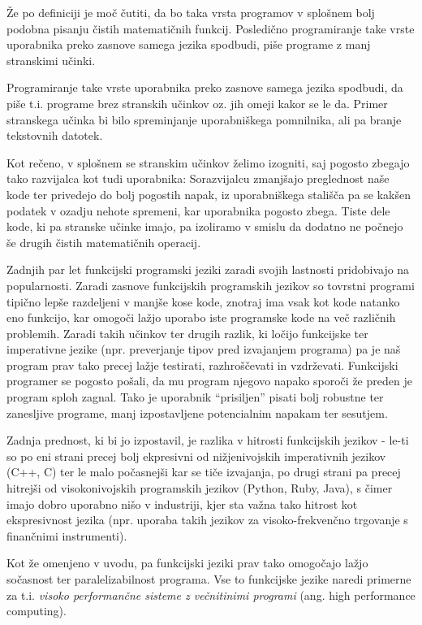 \documentclass[mat1, tisk]{fmfdelo}
\begin{document}
Že po definiciji je moč čutiti, da bo taka vrsta programov v splošnem bolj podobna pisanju čistih matematičnih funkcij. Posledično programiranje take vrste uporabnika preko zasnove samega jezika
spodbudi, piše programe z manj stranskimi učinki.

Programiranje take vrste uporabnika preko zasnove samega jezika spodbudi, da piše t.i. programe brez stranskih učinkov oz. jih omeji kakor se le da. 
Primer stranskega učinka bi bilo spreminjanje uporabniškega pomnilnika, ali pa branje tekstovnih datotek.

Kot rečeno, v splošnem se stranskim učinkov želimo izogniti, saj pogosto zbegajo tako razvijalca kot tudi uporabnika: 
Sorazvijalcu zmanjšajo preglednost naše kode ter privedejo do bolj pogostih napak, iz uporabniškega stališča pa se kakšen podatek v ozadju nehote spremeni, kar uporabnika pogosto zbega. 
Tiste dele kode, ki pa stranske učinke imajo, pa izoliramo v smislu da dodatno ne počnejo še drugih čistih matematičnih operacij.


Zadnjih par let funkcijski programski jeziki zaradi svojih lastnosti pridobivajo na popularnosti. 
Zaradi zasnove funkcijskih programskih jezikov so tovrstni programi tipično lepše razdeljeni v manjše kose kode, znotraj ima vsak kot kode natanko eno funkcijo, 
kar omogoči lažjo uporabo iste programske kode na več različnih problemih. 
Zaradi takih učinkov ter drugih razlik, ki ločijo funkcijske ter imperativne jezike (npr. preverjanje tipov pred izvajanjem programa) pa je naš program prav tako precej lažje testirati, razhroščevati in vzdrževati. 
Funkcijski programer se pogosto pošali, da mu program njegovo napako sporoči že preden je program sploh zagnal. 
Tako je uporabnik ``prisiljen'' pisati bolj robustne ter zanesljive programe, manj izpostavljene potencialnim napakam ter sesutjem.

Zadnja prednost, ki bi jo izpostavil, je razlika v hitrosti funkcijskih jezikov - le-ti so po eni strani precej bolj ekpresivni od nižjenivojskih imperativnih jezikov (C++, C) 
ter le malo počasnejši kar se tiče izvajanja, po drugi strani pa precej  hitrejši od visokonivojskih programskih jezikov (Python, Ruby, Java), 
s čimer imajo dobro uporabno nišo v industriji, kjer sta važna tako hitrost kot ekspresivnost jezika (npr. uporaba takih jezikov za visoko-frekvenčno trgovanje s finančnimi instrumenti).

Kot že omenjeno v uvodu, pa funkcijski jeziki prav tako omogočajo lažjo sočasnost ter paralelizabilnost programa. 
Vse to funkcijske jezike naredi primerne za t.i. \textit{visoko performančne sisteme z večnitinimi programi} (ang. high performance computing).
\end{document}
